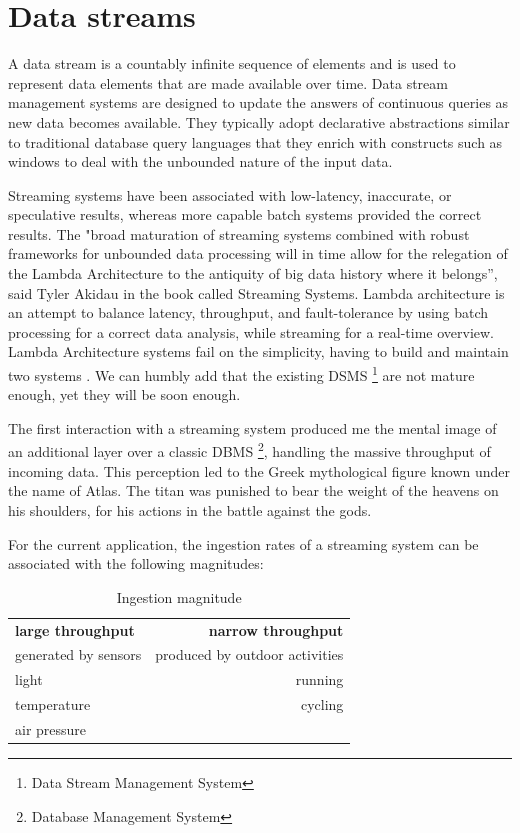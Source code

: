 \clearpage
\section{Data streams}

A data stream is a countably inﬁnite sequence of elements and is used to represent data elements that are made available over time. Data stream management systems are designed to update the answers of continuous queries as new data becomes available. They typically adopt declarative abstractions similar to traditional database query languages that they enrich with constructs such as windows to deal with the unbounded nature of the input data. \cite{defs}

Streaming systems have been associated with low-latency, inaccurate, or speculative results, whereas more capable batch systems provided the correct results. The "broad maturation of streaming systems combined with robust frameworks for unbounded data processing will in time allow for the relegation of the Lambda Architecture to the antiquity of big data history where it belongs”, said Tyler Akidau in the book called Streaming Systems. Lambda architecture is an attempt to balance latency, throughput, and fault-tolerance by using batch processing for a correct data analysis, while streaming for a real-time overview. Lambda Architecture systems fail on the simplicity, having to build and maintain two systems \cite{TheDataflowModel}. We can humbly add that the existing DSMS \footnote{Data Stream Management System} are not mature enough, yet they will be soon enough.

The first interaction with a streaming system produced me the mental image of an additional layer over a classic DBMS \footnote{Database Management System}, handling the massive throughput of incoming data. This perception led to the Greek mythological figure known under the name of Atlas. The titan was punished to bear the weight of the heavens on his shoulders, for his actions in the battle against the gods.

For the current application, the ingestion rates of a streaming system can be associated with the following magnitudes:
\begin{table}[h!]
  \begin{center}
    \label{tab:table1}
    \caption{Ingestion magnitude}
    \begin{tabular}{l|r} %
      \textbf{large throughput} & \textbf{narrow throughput}\\
      generated by sensors & produced by outdoor activities\\
      \hline
      light & running\\
      temperature & cycling\\
      air pressure & \\
    \end{tabular}
  \end{center}
\end{table}

